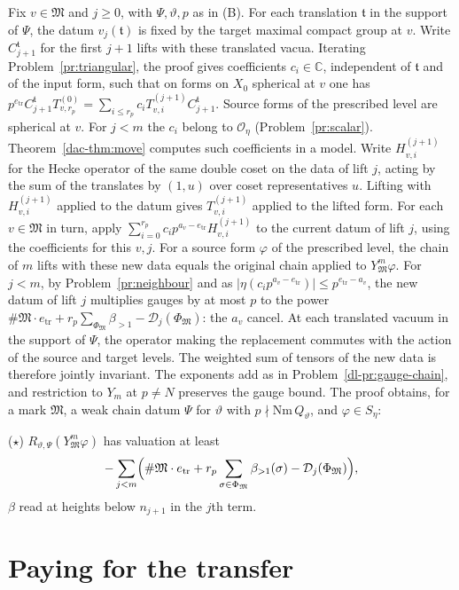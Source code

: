\documentclass[reqno]{amsart}
\theoremstyle{plain}
\theoremstyle{definition}
\theoremstyle{remark}
\newcommand{\C}{\mathbb{C}}
\newcommand{\Oc}{\mathcal O}
\newcommand{\Dc}{\mathcal D}
\newcommand{\Mk}{\mathfrak M}
\newcommand{\bl}{\beta_{>1}}
\newcommand{\tr}{e_{\mathrm{tr}}}
\begin{document}
Fix \(v\in\Mk\) and \(j\ge0\), with \(\Psi,\vartheta,p\) as in (B).  For each translation \(\mathfrak t\) in the support of \(\Psi\), the datum \(v_j(\mathfrak t)\) is fixed by the target maximal compact group at \(v\).  Write \(C_{j+1}^{\mathfrak t}\) for the first \(j+1\) lifts with these translated vacua.  Iterating Problem~\ref{pr:triangular}, the proof gives coefficients \(c_i\in\C\), independent of \(\mathfrak t\) and of the input form, such that on forms on \(X_0\) spherical at \(v\) one has \(p^{\tr} C_{j+1}^{\mathfrak t}T^{(0)}_{v,r_p}=\sum_{i\le r_p}c_i T^{(j+1)}_{v,i}C_{j+1}^{\mathfrak t}\).  Source forms of the prescribed level are spherical at \(v\).  For \(j<m\) the \(c_i\) belong to \(\Oc_\eta\) (Problem~\ref{pr:scalar}).  Theorem~\ref{dac-thm:move} computes such coefficients in a model.  Write \(H^{(j+1)}_{v,i}\) for the Hecke operator of the same double coset on the data of lift \(j\), acting by the sum of the translates by \((1,u)\) over coset representatives \(u\).  Lifting with \(H^{(j+1)}_{v,i}\) applied to the datum gives \(T^{(j+1)}_{v,i}\) applied to the lifted form.  For each \(v\in\Mk\) in turn, apply \(\sum_{i=0}^{r_p}c_i p^{a_v-\tr}H^{(j+1)}_{v,i}\) to the current datum of lift \(j\), using the coefficients for this \(v,j\).  For a source form \(\varphi\) of the prescribed level, the chain of \(m\) lifts with these new data equals the original chain applied to \(Y_{\Mk}^m\varphi\).  For \(j < m\), by Problem~\ref{pr:neighbour} and as \(\lvert\eta(c_ip^{a_v - \tr})\rvert \le p^{\tr - a_v}\), the new datum of lift \(j\) multiplies gauges by at most \(p\) to the power \(\#\Mk\cdot\tr + r_p\sum_{\Phi_{\Mk}}\bl - \Dc_j(\Phi_{\Mk})\): the \(a_v\) cancel.  At each translated vacuum in the support of \(\Psi\), the operator making the replacement commutes with the action of the source and target levels.  The weighted sum of tensors of the new data is therefore jointly invariant.  The exponents add as in Problem~\ref{dl-pr:gauge-chain}, and restriction to \(Y_m\) at \(p\ne N\) preserves the gauge bound.  The proof obtains, for a mark \(\Mk\), a weak chain datum \(\Psi\) for \(\vartheta\) with \(p \nmid \mathrm{Nm}\,Q_\vartheta\), and \(\varphi \in S_\eta\):

\smallskip
\noindent(\(\star\)) \(R_{\vartheta,\Psi}(Y_{\Mk}^m\varphi)\) has valuation at least
\[
  -\sum_{j<m}\Bigl(\#\Mk\cdot \tr + r_p \sum_{\sigma \in \Phi_{\Mk}} \bl(\sigma) - \Dc_j(\Phi_{\Mk})\Bigr) ,
\]
\(\beta\) read at heights below \(n_{j+1}\) in the \(j\)th term.

\section{Paying for the transfer}\label{sec:pay}
\end{document}
